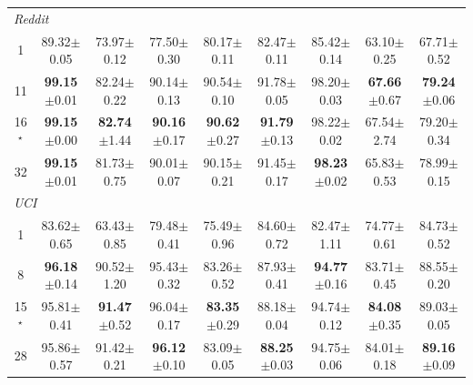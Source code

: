 \begin{table}[p]
\begin{tabular}{ccccccccc}
\midrule
\multicolumn{9}{l}{\textit{Reddit}} \\
1 & 89.32{\scriptsize$\pm$0.05} & 73.97{\scriptsize$\pm$0.12} & 77.50{\scriptsize$\pm$0.30} & 80.17{\scriptsize$\pm$0.11} & 82.47{\scriptsize$\pm$0.11} & 85.42{\scriptsize$\pm$0.14} & 63.10{\scriptsize$\pm$0.25} & 67.71{\scriptsize$\pm$0.52} \\
11 & \textbf{99.15}{\scriptsize$\pm$0.01} & 82.24{\scriptsize$\pm$0.22} & 90.14{\scriptsize$\pm$0.13} & 90.54{\scriptsize$\pm$0.10} & 91.78{\scriptsize$\pm$0.05} & 98.20{\scriptsize$\pm$0.03} & \textbf{67.66}{\scriptsize$\pm$0.67} & \textbf{79.24}{\scriptsize$\pm$0.06} \\
16$^\star$ & \textbf{99.15}{\scriptsize$\pm$0.00} & \textbf{82.74}{\scriptsize$\pm$1.44} & \textbf{90.16}{\scriptsize$\pm$0.17} & \textbf{90.62}{\scriptsize$\pm$0.27} & \textbf{91.79}{\scriptsize$\pm$0.13} & 98.22{\scriptsize$\pm$0.02} & 67.54{\scriptsize$\pm$2.74} & 79.20{\scriptsize$\pm$0.34} \\
32 & \textbf{99.15}{\scriptsize$\pm$0.01} & 81.73{\scriptsize$\pm$0.75} & 90.01{\scriptsize$\pm$0.07} & 90.15{\scriptsize$\pm$0.21} & 91.45{\scriptsize$\pm$0.17} & \textbf{98.23}{\scriptsize$\pm$0.02} & 65.83{\scriptsize$\pm$0.53} & 78.99{\scriptsize$\pm$0.15} \\
\midrule
\multicolumn{9}{l}{\textit{UCI}} \\
1 & 83.62{\scriptsize$\pm$0.65} & 63.43{\scriptsize$\pm$0.85} & 79.48{\scriptsize$\pm$0.41} & 75.49{\scriptsize$\pm$0.96} & 84.60{\scriptsize$\pm$0.72} & 82.47{\scriptsize$\pm$1.11} & 74.77{\scriptsize$\pm$0.61} & 84.73{\scriptsize$\pm$0.52} \\
8 & \textbf{96.18}{\scriptsize$\pm$0.14} & 90.52{\scriptsize$\pm$1.20} & 95.43{\scriptsize$\pm$0.32} & 83.26{\scriptsize$\pm$0.52} & 87.93{\scriptsize$\pm$0.41} & \textbf{94.77}{\scriptsize$\pm$0.16} & 83.71{\scriptsize$\pm$0.45} & 88.55{\scriptsize$\pm$0.20} \\
15$^\star$ & 95.81{\scriptsize$\pm$0.41} & \textbf{91.47}{\scriptsize$\pm$0.52} & 96.04{\scriptsize$\pm$0.17} & \textbf{83.35}{\scriptsize$\pm$0.29} & 88.18{\scriptsize$\pm$0.04} & 94.74{\scriptsize$\pm$0.12} & \textbf{84.08}{\scriptsize$\pm$0.35} & 89.03{\scriptsize$\pm$0.05} \\
28 & 95.86{\scriptsize$\pm$0.57} & 91.42{\scriptsize$\pm$0.21} & \textbf{96.12}{\scriptsize$\pm$0.10} & 83.09{\scriptsize$\pm$0.05} & \textbf{88.25}{\scriptsize$\pm$0.03} & 94.75{\scriptsize$\pm$0.06} & 84.01{\scriptsize$\pm$0.18} & \textbf{89.16}{\scriptsize$\pm$0.09} \\

\end{tabular}
\end{table}
